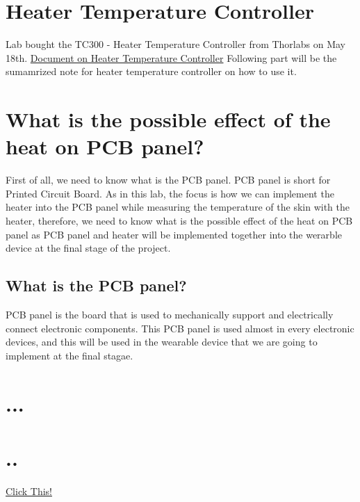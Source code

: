 \documentclass{article}
\begin{document}
\section{Heater Temperature Controller}
Lab bought the TC300 - Heater Temperature Controller from Thorlabs on May 18th.
\href{https://www.thorlabs.com/drawings/1a9e0ae31580f35c-5554A647-C109-6112-A4FC47A27614B988/TC300-Manual.pdf}{Document on Heater Temperature Controller}
Following part will be the sumamrized note for heater temperature controller on how to use it. 


\section{What is the possible effect of the heat on PCB panel?}
First of all, we need to know what is the PCB panel.
PCB panel is short for Printed Circuit Board.
As in this lab, the focus is how we can implement the heater into the PCB panel while measuring the temperature
of the skin with the heater, therefore, we need to know what is the possible effect of the heat on PCB panel 
as PCB panel and heater will be implemented together into the werarble device at the final stage of the project.

\subsection{What is the PCB panel?}
PCB panel is the board that is used to mechanically support and electrically connect electronic components.
This PCB panel is used almost in every electronic devices, and this will be used in the wearable device that we are 
going to implement at the final stagae. 






\section{...}

\section{..}


\href{}{Click This!} 
\end{document}
